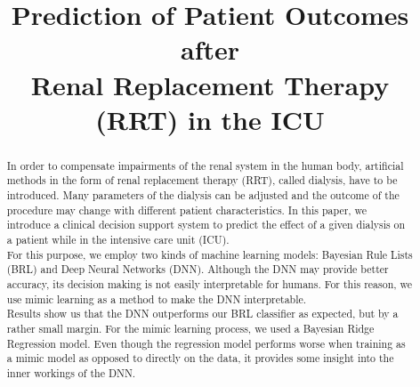\documentclass[conference,compsoc]{IEEEtran}
\begin{document}
\title{Prediction of Patient Outcomes after \\Renal Replacement Therapy (RRT) in the ICU }


\author{
\and
{}
}
\maketitle

\begin{abstract}
In order to compensate impairments of the renal system in the human body, artificial methods in the form of renal replacement therapy (RRT), called dialysis, have to be introduced.
Many parameters of the dialysis can be adjusted and the outcome of the procedure may change with different patient characteristics. 
In this paper, we introduce a clinical decision support system to predict the effect of a given dialysis on a patient while in the intensive care unit (ICU). \\
For this purpose, we employ two kinds of machine learning models: Bayesian Rule Lists (BRL) and Deep Neural Networks (DNN). Although the DNN may provide better accuracy, its decision making is not easily interpretable for humans. For this reason, we use mimic learning as a method to make the DNN interpretable. \\
Results show us that the DNN outperforms our BRL classifier as expected, but by a rather small margin.
For the mimic learning process, we used a Bayesian Ridge Regression model.
Even though the regression model performs worse when training as a mimic model as opposed to directly on the data, it provides some insight into the inner workings of the DNN.
\end{abstract}
\end{document}
